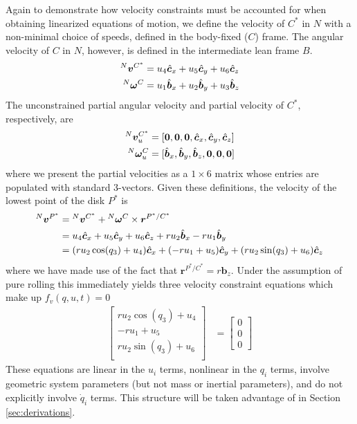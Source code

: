 Again to demonstrate how velocity constraints must be accounted for when
obtaining linearized equations of motion, we define the velocity of $C^*$ in
$N$ with a non-minimal choice of speeds, defined in the body-fixed ($C$) frame.
The angular velocity of $C$ in $N$, however, is defined in the intermediate
lean frame $B$.
\begin{align}
  \label{v_u}
  {^N}\boldsymbol{v}^{C^*} &= u_4 \hat{\boldsymbol{c}}_{x} + u_5 \hat{\boldsymbol{c}}_{y} + u_6 \hat{\boldsymbol{c}}_{z} \\
  \label{w_u}
  {^N}\boldsymbol{\omega}^C &= u_1 \hat{\boldsymbol{b}}_{x} + u_2 \hat{\boldsymbol{b}}_{y} + u_3 \hat{\boldsymbol{b}}_{z}
\end{align}
The unconstrained partial angular velocity and partial velocity of $C^*$,
respectively, are
\begin{align}
  {^N}\boldsymbol{v}^{C^*}_u &= [\boldsymbol{0}, \boldsymbol{0}, \boldsymbol{0}, \hat{\boldsymbol{c}}_{x}, \hat{\boldsymbol{c}}_{y}, \hat{\boldsymbol{c}}_{z}] \\
  {^N}\boldsymbol{\omega}^C_u &= [\hat{\boldsymbol{b}}_{x}, \hat{\boldsymbol{b}}_{y}, \hat{\boldsymbol{b}}_{z}, \boldsymbol{0}, \boldsymbol{0}, \boldsymbol{0}]
\end{align}
where we present the partial velocities as a $1\times6$ matrix whose entries
are populated with standard 3-vectors. Given these definitions, the velocity of
the lowest point of the disk $P^*$ is
\begin{align*}
  {^N}\boldsymbol{v}^{P^*} &= {^N}\boldsymbol{v}^{C^*} + {^N}\boldsymbol{\omega}^{C} \times \boldsymbol{r}^{P^*/C^*} \\
  &= u_4\hat{\boldsymbol{c}}_{x} + u_5\hat{\boldsymbol{c}}_{y} + u_6\hat{\boldsymbol{c}}_{z} + r u_2
  \hat{\boldsymbol{b}}_{x} - r u_1 \hat{\boldsymbol{b}}_{y} \\
  &= (r u_2 \cos(q_3) + u_4) \hat{\boldsymbol{c}}_{x} + (-r u_1 + u_5)\hat{\boldsymbol{c}}_{y} + (r u_2 \sin(q_3) +
  u_6) \hat{\boldsymbol{c}}_{z}
\end{align*}
where we have made use of the fact that $\bm{r}^{P^*/C^*} = r\bm{b}_z$.
Under the assumption of pure rolling this immediately yields three velocity
constraint equations which make up $f_v(q, u, t) = 0$
\begin{subequations}
\label{rd:f_v}
\begin{align}
  \begin{bmatrix}
    r u_2 \cos(q_3) + u_4 \\
    -r u_1 + u_5 \\
    r u_2 \sin(q_3) + u_6 \\
  \end{bmatrix} &=
  \begin{bmatrix} 0 \\ 0 \\ 0 \end{bmatrix}
\end{align}
\end{subequations}
These equations are linear in the $u_i$ terms, nonlinear in the $q_i$ terms,
involve geometric system parameters (but not mass or inertial parameters), and
do not explicitly involve $\dot{q}_i$ terms. This structure will be taken
advantage of in Section \ref{sec:derivations}.

